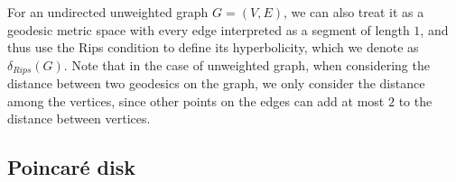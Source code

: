 \documentclass[11pt]{article}
\begin{document}
For an undirected unweighted graph $G=(V,E)$, 
	we can also treat it as a geodesic metric space with every edge
	interpreted as a segment of length $1$, and thus use
	the Rips condition to define its hyperbolicity, which we denote
	as $\delta_{Rips}(G)$. 
Note that in the case of unweighted graph, when considering the distance
	between two geodesics on the graph, we only consider the distance
	among the vertices, since other points on the edges can add at most
	$2$ to the distance between vertices.



\subsection{Poincar\'{e} disk}
\end{document}
